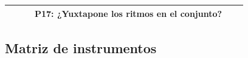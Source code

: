 \documentclass[12pt,a4paper]{article}
\begin{document}
\begin{landscape}
\begin{table}[ht!]
\begin{tabular}{clllcc}
			                                                       &                           &                                    & P17: ¿Yuxtapone los ritmos en el conjunto?                      &                                                                                                                                                        \\\hline
		\end{tabular}
	\end{table}
\end{landscape}


\begin{landscape}
	\subsection{Matriz de instrumentos}


\end{landscape}
\end{document}
